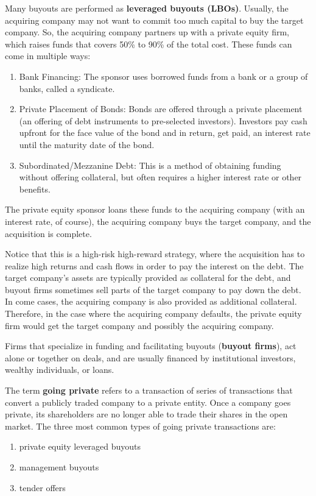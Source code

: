 \documentclass{article}
\begin{document}
    \begin{definition}
      Many buyouts are performed as \textbf{leveraged buyouts (LBOs)}. Usually, the acquiring company may not want to commit too much capital to buy the target company. So, the acquiring company partners up with a private equity firm, which raises funds that covers 50\% to 90\% of the total cost. These funds can come in multiple ways: 
      \begin{enumerate}
        \item Bank Financing: The sponsor uses borrowed funds from a bank or a group of banks, called a syndicate. 
        \item Private Placement of Bonds: Bonds are offered through a private placement (an offering of debt instruments to pre-selected investors). Investors pay cash upfront for the face value of the bond and in return, get paid, an interest rate until the maturity date of the bond. 
        \item Subordinated/Mezzanine Debt: This is a method of obtaining funding without offering collateral, but often requires a higher interest rate or other benefits. 
      \end{enumerate}
      The private equity sponsor loans these funds to the acquiring company (with an interest rate, of course), the acquiring company buys the target company, and the acquisition is complete. 

      Notice that this is a high-risk high-reward strategy, where the acquisition has to realize high returns and cash flows in order to pay the interest on the debt. The target company's assets are typically provided as collateral for the debt, and buyout firms sometimes sell parts of the target company to pay down the debt. In come cases, the acquiring company is also provided as additional collateral. Therefore, in the case where the acquiring company defaults, the private equity firm would get the target company and possibly the acquiring company. 

      Firms that specialize in funding and facilitating buyouts (\textbf{buyout firms}), act alone or together on deals, and are usually financed by institutional investors, wealthy individuals, or loans. 
    \end{definition}

    The term \textbf{going private} refers to a transaction of series of transactions that convert a publicly traded company to a private entity. Once a company goes private, its shareholders are no longer able to trade their shares in the open market. The three most common types of going private transactions are: 
    \begin{enumerate}
      \item private equity leveraged buyouts
      \item management buyouts
      \item tender offers
    \end{enumerate}
\end{document}
